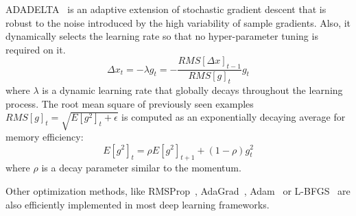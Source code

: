         ADADELTA~\cite{DBLP:journals/corr/abs-1212-5701} is an adaptive extension of stochastic gradient descent
        that is robust to the noise introduced by the high variability of sample gradients. Also, it dynamically
        selects the learning rate so that no hyper-parameter tuning is required on it.
        \begin{equation}
            \Delta x_t = - \lambda g_t = - \frac{RMS[\Delta x]_{t-1}}{RMS[g]_t} g_t
        \end{equation}
        where $\lambda$ is a dynamic learning rate that globally decays throughout the learning process.
        The root mean square of previously seen examples $RMS[g]_t = \sqrt{E[g^2]_t + \epsilon}$ is computed 
        as an exponentially decaying average for memory efficiency:
        \begin{equation}
            E[g^2]_t = \rho E[g^2]_{t+1} + (1 - \rho) g^2_t
        \end{equation}
        where $\rho$ is a decay parameter similar to the momentum.

        Other optimization methods, like RMSProp~\cite{graves2013generating},
        AdaGrad~\cite{duchi2011adaptive}, Adam~\cite{DBLP:journals/corr/KingmaB14}
        or L-BFGS~\cite{LBFGS} are also efficiently implemented in most deep learning 
        frameworks.

